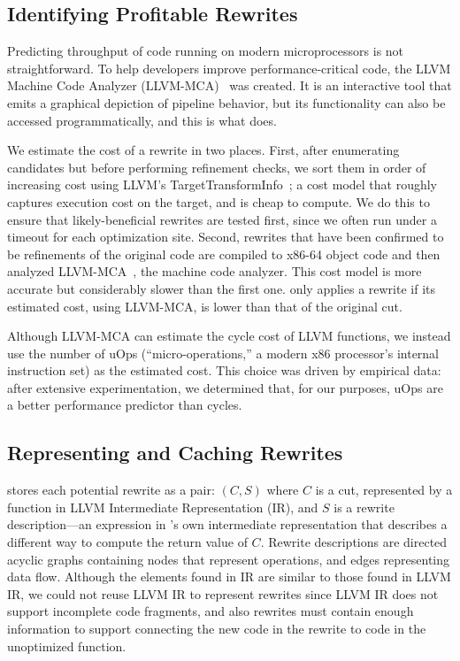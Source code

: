 \subsection{Identifying Profitable Rewrites}

Predicting throughput of code running on modern microprocessors is not
straightforward.
%
To help developers improve performance-critical code, the LLVM Machine
Code Analyzer (LLVM-MCA)~\cite{llvmmca} was created.
%
It is an interactive tool that emits a graphical depiction of pipeline
behavior, but its functionality can also be accessed programmatically,
and this is what \minotaur{} does.


We estimate the cost of a rewrite in two places.
%
First, after enumerating candidates but before performing refinement
checks, we sort them in order of increasing cost using LLVM's
TargetTransformInfo~\cite{tti}; a cost model that roughly captures
execution cost on the target, and is cheap to compute.
%
We do this to ensure that likely-beneficial rewrites are tested first,
since we often run \minotaur{} under a timeout for each optimization site.
%
Second, rewrites that have been confirmed to be refinements of the
original code are compiled to x86-64 object code and then analyzed
LLVM-MCA~\cite{llvmmca}, the machine code analyzer.
%
This cost model is more accurate but considerably slower than the
first one.
%
\minotaur{} only applies a rewrite if its estimated cost, using LLVM-MCA,
is lower than that of the original cut.


Although LLVM-MCA can estimate the cycle cost of LLVM functions, we instead use
the number of uOps (``micro-operations,'' a modern x86 processor's internal
instruction set) as the estimated cost.
%
This choice was driven by empirical data: after extensive
experimentation, we determined that, for our purposes, uOps are a
better performance predictor than cycles.



\subsection{Representing and Caching Rewrites}
\label{sec:rewrite}

\minotaur{} stores each potential rewrite as a pair: $(C, S)$
where $C$ is a cut, represented by a function in LLVM
Intermediate Representation (IR), and $S$ is a rewrite description---an
expression in \minotaur's own intermediate representation that describes a
different way to compute the return value of $C$.
%
Rewrite descriptions are directed acyclic graphs containing nodes that represent
operations, and edges representing data flow.
%
Although the elements found in \minotaur{} IR are similar to those found
in LLVM IR, we could not reuse LLVM IR to represent rewrites since
LLVM IR does not support incomplete code fragments, and also rewrites
must contain enough information to support connecting the new code in
the rewrite to code in the unoptimized function.


